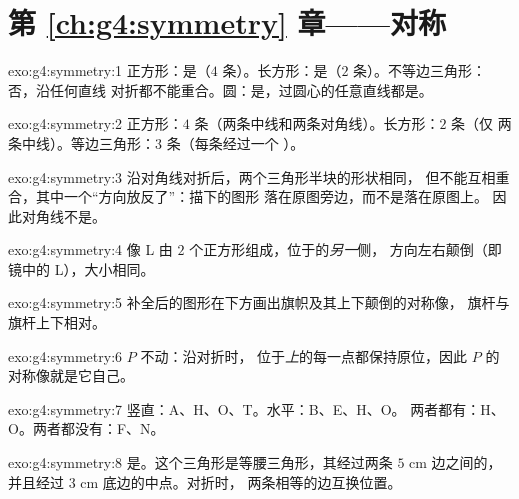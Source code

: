 \section*{第 \ref{ch:g4:symmetry} 章——对称}

\begin{solution}{exo:g4:symmetry:1}
正方形：是（$4$ 条）。长方形：是（$2$ 条）。不等边三角形：否，沿任何直线
对折都不能重合。圆：是，过圆心的任意直线都是。
\end{solution}

\begin{solution}{exo:g4:symmetry:2}
正方形：$4$ 条（两条中线和两条对角线）。长方形：$2$ 条（仅
两条中线）。等边三角形：$3$ 条（每条经过一个
）。
\end{solution}

\begin{solution}{exo:g4:symmetry:3}
沿对角线对折后，两个三角形半块的形状相同，
但不能互相重合，其中一个“方向放反了”：描下的图形
落在原图旁边，而不是落在原图上。
因此对角线不是。
\end{solution}

\begin{solution}{exo:g4:symmetry:4}
像 L 由 $2$ 个正方形组成，位于的\emph{另一}侧，
方向左右颠倒（即镜中的 L），大小相同。
\end{solution}

\begin{solution}{exo:g4:symmetry:5}
补全后的图形在下方画出旗帜及其上下颠倒的对称像，
旗杆与旗杆上下相对。
\end{solution}

\begin{solution}{exo:g4:symmetry:6}
$P$ 不动：沿对折时，
位于\emph{上}的每一点都保持原位，因此 $P$ 的对称像就是它自己。
\end{solution}

\begin{solution}{exo:g4:symmetry:7}
竖直：A、H、O、T。水平：B、E、H、O。
两者都有：H、O。两者都没有：F、N。
\end{solution}

\begin{solution}{exo:g4:symmetry:8}
是。这个三角形是等腰三角形，其经过两条 $5$ cm 边之间的，
并且经过 $3$ cm 底边的中点。对折时，
两条相等的边互换位置。
\end{solution}

